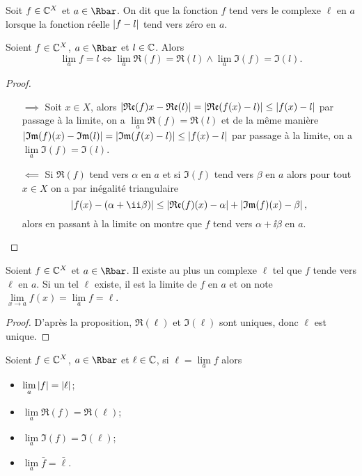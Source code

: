 \begin{defdef}
  Soit $f \in \mathbb{C}^X$ et $a \in \Rbar$. On dit que la fonction $f$ tend vers le complexe $\ell$ en $a$ lorsque la fonction réelle $\left\lvert f-l\right\rvert$ tend vers zéro en $a$.
\end{defdef}
\begin{prop}
  Soient $f \in \mathbb{C}^X$, $a \in \Rbar$ et $l \in \mathbb{C}$. Alors
  \begin{equation}
    \lim\limits_{a}f = l \iff \lim\limits_{a}\Re(f) = \Re(l) \wedge \lim\limits_{a}\Im(f) = \Im(l).
  \end{equation}
\end{prop}
\begin{proof}
  \begin{itemize}
  \item[$\implies$] Soit $x \in X$, alors $\left\lvert\mathfrak{Re}(f)x-\mathfrak{Re}(l)\right\rvert=\left\lvert\mathfrak{Re}(f(x)-l)\right\rvert \leq \left\lvert f(x)-l\right\rvert$ par passage à la limite, on a $\lim\limits_{a}\Re(f) = \Re(l)$ et de la même manière $\left\lvert\mathfrak{Im}(f)(x)-\mathfrak{Im}(l)\right\rvert=\left\lvert\mathfrak{Im}(f(x)-l)\right\rvert \leq \left\lvert f(x)-l\right\rvert$ par passage à la limite, on a $\lim\limits_{a}\Im(f) = \Im(l)$.
  \item[$\impliedby$] Si $\Re(f)$ tend vers $\alpha$ en $a$ et si $\Im(f)$ tend vers $\beta$ en $a$ alors pour tout $x \in X$ on a par inégalité triangulaire
    \begin{equation}
      \abs{f(x)-(\alpha+\ii \beta)} \leq \abs{\Re(f)(x)-\alpha} + \abs{\Im(f)(x)-\beta},
    \end{equation}
    alors en passant à la limite on montre que $f$ tend vers $\alpha+\ii \beta$ en $a$.
  \end{itemize}
\end{proof}
\begin{cor}
  Soient $f \in \mathbb{C}^X$ et $a \in \Rbar$. Il existe au plus un complexe $\ell$ tel que $f$ tende vers $\ell$ en $a$. Si un tel $\ell$ existe, il est la limite de $f$ en $a$ et on note $\lim\limits_{x \to a} f(x)=\lim\limits_{a}f = \ell$.
\end{cor}
\begin{proof}
  D'après la proposition, $\Re(\ell)$ et $\Im(\ell)$ sont uniques, donc $\ell$ est unique.
\end{proof}
\begin{prop}
  Soient $f \in \mathbb{C}^X$, $a \in \Rbar$ et $\ell \in \mathbb{C}$, si $\ell=\lim\limits_{a}f$ alors
  \begin{itemize}
  \item $\lim\limits_{a} \left\lvert f\right\rvert=\left\lvert\ell\right\rvert$;
  \item $\lim\limits_{a} \Re(f)=\Re(\ell)$;
  \item $\lim\limits_{a} \Im(f)=\Im(\ell)$;
  \item $\lim\limits_{a} \bar{f}=\bar{\ell}$.
  \end{itemize}
\end{prop}
